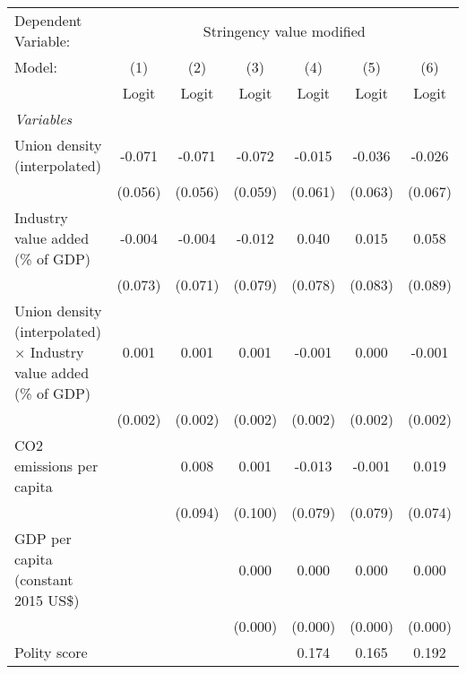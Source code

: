 
\begingroup
\centering
\begin{tabular}{lcccccc}
   \toprule
   Dependent Variable: & \multicolumn{6}{c}{Stringency value modified}\\
   Model:                                                                   & (1)     & (2)     & (3)     & (4)     & (5)     & (6)\\  
                                                                            &  Logit  & Logit   & Logit   & Logit   & Logit   & Logit\\  
   \midrule
   \emph{Variables}\\
   Union density (interpolated)                                             & -0.071  & -0.071  & -0.072  & -0.015  & -0.036  & -0.026\\   
                                                                            & (0.056) & (0.056) & (0.059) & (0.061) & (0.063) & (0.067)\\   
   Industry value added (\% of GDP)                                         & -0.004  & -0.004  & -0.012  & 0.040   & 0.015   & 0.058\\   
                                                                            & (0.073) & (0.071) & (0.079) & (0.078) & (0.083) & (0.089)\\   
   Union density (interpolated) $\times$ Industry value added (\% of GDP)   & 0.001   & 0.001   & 0.001   & -0.001  & 0.000   & -0.001\\   
                                                                            & (0.002) & (0.002) & (0.002) & (0.002) & (0.002) & (0.002)\\   
   CO2 emissions per capita                                                 &         & 0.008   & 0.001   & -0.013  & -0.001  & 0.019\\   
                                                                            &         & (0.094) & (0.100) & (0.079) & (0.079) & (0.074)\\   
   GDP per capita (constant 2015 US\$)                                      &         &         & 0.000   & 0.000   & 0.000   & 0.000\\   
                                                                            &         &         & (0.000) & (0.000) & (0.000) & (0.000)\\   
   Polity score                                                             &         &         &         & 0.174   & 0.165   & 0.192\\   

\end{tabular}
